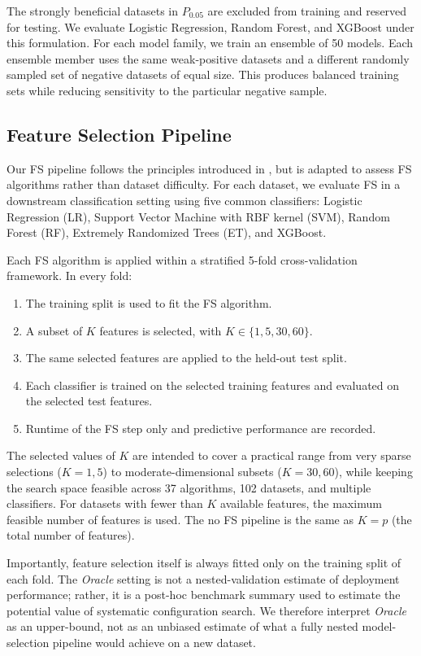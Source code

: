 \documentclass[preprint,12pt,authoryear]{elsarticle}
\begin{document}
The strongly beneficial datasets in $P_{0.05}$ are excluded from training and reserved for testing. We evaluate Logistic Regression, Random Forest, and XGBoost under this formulation. For each model family, we train an ensemble of 50 models. Each ensemble member uses the same weak-positive datasets and a different randomly sampled set of negative datasets of equal size. This produces balanced training sets while reducing sensitivity to the particular negative sample.



\subsection{Feature Selection Pipeline}

Our FS pipeline follows the principles introduced in \cite{elmakias2025choosing}, but is adapted to assess FS algorithms rather than dataset difficulty. For each dataset, we evaluate FS in a downstream classification setting using five common classifiers: Logistic Regression (LR), Support Vector Machine with RBF kernel (SVM), Random Forest (RF), Extremely Randomized Trees (ET), and XGBoost.

Each FS algorithm is applied within a stratified 5-fold cross-validation framework. In every fold:
\begin{enumerate}
    \item The training split is used to fit the FS algorithm.
    \item A subset of $K$ features is selected, with $K \in \{1,5,30,60\}$.
    \item The same selected features are applied to the held-out test split.
    \item Each classifier is trained on the selected training features and evaluated on the selected test features.
    \item Runtime of the FS step only and predictive performance are recorded.
\end{enumerate}

The selected values of $K$ are intended to cover a practical range from very sparse selections ($K=1,5$) to moderate-dimensional subsets ($K=30,60$), while keeping the search space feasible across 37 algorithms, 102 datasets, and multiple classifiers. For datasets with fewer than $K$ available features, the maximum feasible number of features is used. The no FS pipeline is the same as $K=p$ (the total number of features).

Importantly, feature selection itself is always fitted only on the training split of each fold. The \emph{Oracle} setting is not a nested-validation estimate of deployment performance; rather, it is a post-hoc benchmark summary used to estimate the potential value of systematic configuration search. We therefore interpret \emph{Oracle} as an upper-bound, not as an unbiased estimate of what a fully nested model-selection pipeline would achieve on a new dataset.
\end{document}
